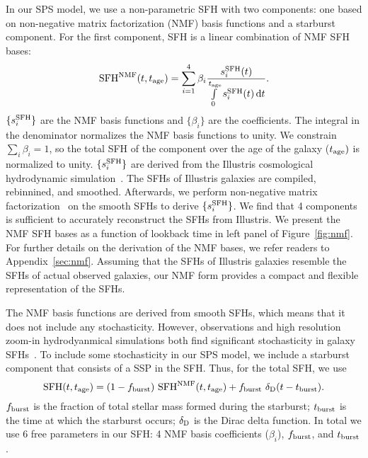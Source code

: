 In our SPS model, we use a non-parametric SFH with two components: one based on
non-negative matrix factorization (NMF) basis functions and a starburst component.
For the first component, SFH is a linear combination of NMF SFH bases:
\begin{equation} \label{eq:nmf} 
    {\rm SFH}^{\rm NMF} (t, t_{\rm age}) = \sum\limits_{i=1}^{4} \beta_i
    \frac{s_i^{\rm SFH}(t)}{\int\limits_0^{t_{\rm age}} s_i^{\rm SFH}(t) \,
    {\rm d}t}. 
\end{equation} 
$\{s^{\rm SFH}_i\}$ are the NMF basis functions and $\{\beta_i\}$ are the
coefficients. 
The integral in the denominator normalizes the NMF basis functions to unity. 
We constrain $\sum_i \beta_i = 1$, so the total SFH of the component over the
age of the galaxy ($t_{\rm age})$ is normalized to unity.
$\{s^{\rm SFH}_i\}$ are derived from the Illustris cosmological hydrodynamic
simulation~\citep{vogelsberger2014, genel2014, nelson2015}.
The SFHs of Illustris galaxies are compiled, rebinnined, and smoothed.
Afterwards, we perform non-negative matrix
factorization~\citep{lee1999,cichocki2009, fevotte2011} on the smooth SFHs to
derive $\{s^{\rm SFH}_i\}$. 
We find that 4 components is sufficient to accurately reconstruct the SFHs
from Illustris. 
We present the NMF SFH bases as a function of lookback time in
left panel of Figure~\ref{fig:nmf}.
For further details on the derivation of the NMF bases, we refer readers to
Appendix~\ref{sec:nmf}. 
Assuming that the SFHs of Illustris galaxies resemble the SFHs of actual
observed galaxies, our NMF form provides a compact and flexible representation
of the SFHs. 

The NMF basis functions are derived from smooth SFHs, which means that it does
not include any stochasticity. 
However, observations and high resolution zoom-in hydrodyanmical simulations
both find significant stochasticity in galaxy SFHs~\citep{sparre2017,
caplar2019, hahn2019b, iyer2020}. 
To include some stochasticity in our SPS model, we include a starburst
component that consists of a SSP in the SFH. 
Thus, for the total SFH, we use
\begin{equation} \label{eq:sfh}
    {\rm SFH} (t, t_{\rm age}) = (1 - f_{\rm burst})~{\rm SFH}^{\rm NMF} (t,
    t_{\rm age}) + f_{\rm burst}~\delta_{\rm D}(t - t_{\rm burst}).
\end{equation}
$f_{\rm burst}$ is the fraction of total stellar mass formed during the
starburst; $t_{\rm burst}$ is the time at which the starburst occurs; 
$\delta_{\rm D}$ is the Dirac delta function.
In total we use 6 free parameters in our SFH: 4 NMF basis coefficients 
($\beta_i$), $f_{\rm burst}$, and $t_{\rm burst}$. 

